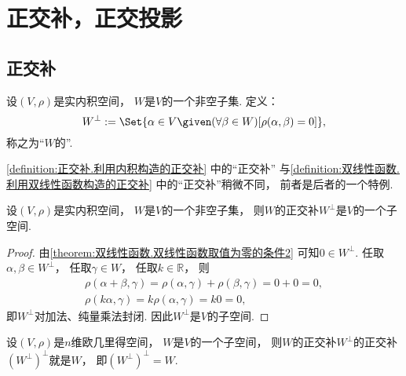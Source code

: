 \section{正交补，正交投影}
\subsection{正交补}
\begin{definition}\label{definition:正交补.利用内积构造的正交补}
设\((V,\rho)\)是实内积空间，
\(W\)是\(V\)的一个非空子集.
定义：\begin{equation*}
	W^\perp
	\defeq
	\Set{
		\alpha \in V
		\given
		(\forall \beta \in W)
		[\rho(\alpha,\beta) = 0]
	},
\end{equation*}
称之为“\(W\)的”.
\end{definition}
\begin{remark}
\cref{definition:正交补.利用内积构造的正交补} 中的“正交补”
与\cref{definition:双线性函数.利用双线性函数构造的正交补} 中的“正交补”稍微不同，
前者是后者的一个特例.
\end{remark}

\begin{property}
设\((V,\rho)\)是实内积空间，
\(W\)是\(V\)的一个非空子集，
则\(W\)的正交补\(W^\perp\)是\(V\)的一个子空间.
\begin{proof}
由\cref{theorem:双线性函数.双线性函数取值为零的条件2} 可知\(0 \in W^\perp\).
任取\(\alpha,\beta \in W^\perp\)，
任取\(\gamma \in W\)，
任取\(k \in \mathbb{R}\)，
则\begin{gather*}
	\rho(\alpha+\beta,\gamma)
	= \rho(\alpha,\gamma) + \rho(\beta,\gamma)
	= 0 + 0 = 0, \\
	\rho(k\alpha,\gamma)
	= k\rho(\alpha,\gamma)
	= k0 = 0,
\end{gather*}
即\(W^\perp\)对加法、纯量乘法封闭.
因此\(W^\perp\)是\(V\)的子空间.
\end{proof}
\end{property}

\begin{property}
设\((V,\rho)\)是\(n\)维欧几里得空间，
\(W\)是\(V\)的一个子空间，
则\(W\)的正交补\(W^\perp\)的正交补\((W^\perp)^\perp\)就是\(W\)，
即\((W^\perp)^\perp = W\).
\end{property}

